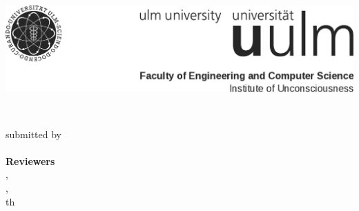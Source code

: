 \begin{titlepage}

    \begin{center}
        \includegraphics[width=\textwidth]{frontmatter/img/logowithfaculty}
    \end{center}

    \vspace{2.5cm}
    \begin{center}
    \Huge{\bfseries\thesistitle} \\
    \vspace{0.25cm}
    \Large{\thtype}

    \vspace{2.5cm}
    \Large{submitted by} \\
    \Large{\fullname} \\

    \vspace{2cm}
    \Large{\textbf{Reviewers}} \\
    \Large{\supervisorA, \supervisorAuni} \\
    \Large{\supervisorB, \supervisorBuni} \\


    \vspace{2cm}
    \Large{\thday{}th \thmonth{ }\thyear}

    \end{center}
\end{titlepage}
\restoregeometry
